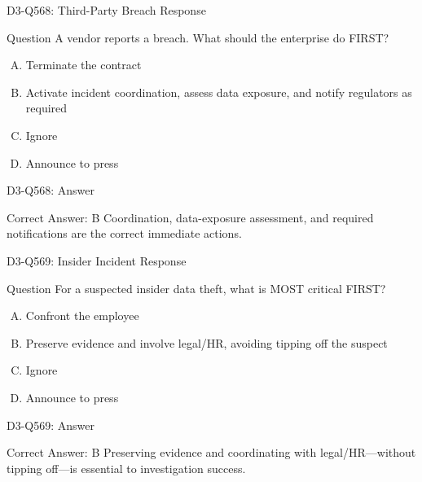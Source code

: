 \documentclass{beamer}
\begin{document}
	\begin{frame}{D3-Q568: Third-Party Breach Response}
		\begin{block}{Question}
			A vendor reports a breach. What should the enterprise do FIRST?
		\end{block}
		\begin{enumerate}[(A)]
			\item Terminate the contract
			\item Activate incident coordination, assess data exposure, and notify regulators as required
			\item Ignore
			\item Announce to press
		\end{enumerate}
	\end{frame}
	\begin{frame}{D3-Q568: Answer}
		\begin{block}{Correct Answer: B}
			Coordination, data-exposure assessment, and required notifications are the correct immediate actions.
		\end{block}
	\end{frame}
	
	\begin{frame}{D3-Q569: Insider Incident Response}
		\begin{block}{Question}
			For a suspected insider data theft, what is MOST critical FIRST?
		\end{block}
		\begin{enumerate}[(A)]
			\item Confront the employee
			\item Preserve evidence and involve legal/HR, avoiding tipping off the suspect
			\item Ignore
			\item Announce to press
		\end{enumerate}
	\end{frame}
	\begin{frame}{D3-Q569: Answer}
		\begin{block}{Correct Answer: B}
			Preserving evidence and coordinating with legal/HR—without tipping off—is essential to investigation success.
		\end{block}
	\end{frame}
	
\end{document}
